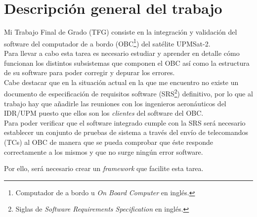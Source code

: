 
\section{Descripción general del trabajo}
Mi Trabajo Final de Grado (TFG) consiste en la integración y validación del
software del computador de a bordo (OBC\footnote{Computador de a bordo u
  \textit{On Board Computer} en inglés.}) del satélite UPMSat-2.\\

  Para llevar a cabo esta tarea es necesario estudiar y aprender en detalle cómo
  funcionan los distintos subsistemas que componen el OBC así como la estructura
  de su software para poder corregir y depurar los errores.\\

  Cabe destacar que en la situación actual en la que me encuentro no existe un
  documento de especificación de requisitos software (SRS\footnote{Siglas de
    \textit{Software Requirements Specification} en inglés.}) definitivo, por lo
  que al trabajo hay que añadirle las reuniones con los ingenieros aeronáuticos
  del IDR/UPM puesto que ellos son los \textit{clientes} del software del OBC.\\

  Para poder verificar que el software integrado cumple con la SRS será
  necesario establecer un conjunto de pruebas de sistema a través del envío
  de telecomandos (TCs) al OBC de manera que se pueda comprobar que éste
  responde correctamente a los mismos y que no surge ningún error software.

  Por ello, será necesario crear un \textit{framework} que facilite esta tarea.\\

  